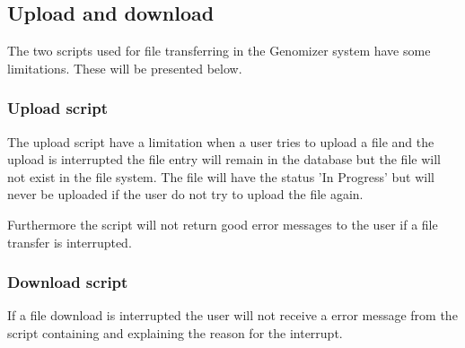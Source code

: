 \subsection{Upload and download}
The two scripts used for file transferring in the Genomizer system have some limitations. These will be presented below.
\subsubsection{Upload script}
The upload script have a limitation when a user tries to upload a file and the upload is interrupted the file entry will remain in the database but the file will not exist in the file system. The file will have the status 'In Progress' but will never be uploaded if the user do not try to upload the file again.

Furthermore the script will not return good error messages to the user if a file transfer is interrupted. 
\subsubsection{Download script}
If a file download is interrupted the user will not receive a error message from the script containing and explaining the reason for the interrupt. 


